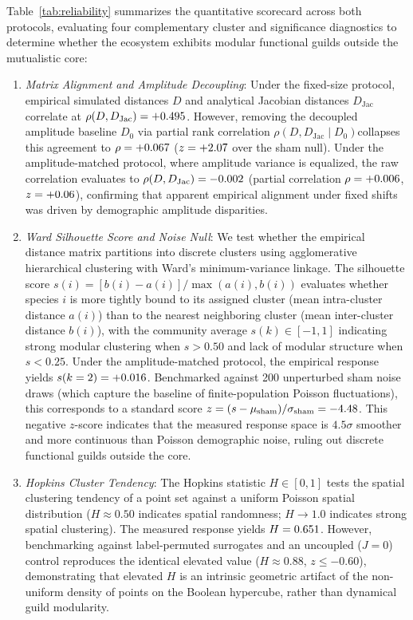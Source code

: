 \documentclass[twocolumn,amsmath,amssymb,aps,pra,10pt,floatfix,nofootinbib]{revtex4-2}
\begin{document}
Table~\ref{tab:reliability} summarizes the quantitative scorecard across both protocols, evaluating four complementary cluster and significance diagnostics to determine whether the ecosystem exhibits modular functional guilds outside the mutualistic core:
\begin{enumerate}
    \item \textit{Matrix Alignment and Amplitude Decoupling}: Under the fixed-size protocol, empirical simulated distances $D$ and analytical Jacobian distances $D_{\text{Jac}}$ correlate at $\rho(D, D_{\text{Jac}}) = +0.495$. However, removing the decoupled amplitude baseline $D_0$ via partial rank correlation $\rho(D, D_{\text{Jac}} \mid D_0)$\footnotemark[2] collapses this agreement to $\rho = +0.067$ ($z = +2.07$ over the sham null). Under the amplitude-matched protocol, where amplitude variance is equalized, the raw correlation evaluates to $\rho(D, D_{\text{Jac}}) = -0.002$ (partial correlation $\rho = +0.006$, $z = +0.06$), confirming that apparent empirical alignment under fixed shifts was driven by demographic amplitude disparities.
    \item \textit{Ward Silhouette Score and Noise Null}: We test whether the empirical distance matrix partitions into discrete clusters using agglomerative hierarchical clustering with Ward's minimum-variance linkage. The silhouette score $s(i) = [b(i) - a(i)] / \max(a(i), b(i))$ evaluates whether species $i$ is more tightly bound to its assigned cluster (mean intra-cluster distance $a(i)$) than to the nearest neighboring cluster (mean inter-cluster distance $b(i)$), with the community average $s(k) \in [-1, 1]$ indicating strong modular clustering when $s > 0.50$ and lack of modular structure when $s < 0.25$. Under the amplitude-matched protocol, the empirical response yields $s(k=2) = +0.016$. Benchmarked against 200 unperturbed sham noise draws (which capture the baseline of finite-population Poisson fluctuations), this corresponds to a standard score $z = (s - \mu_{\text{sham}}) / \sigma_{\text{sham}} = -4.48$. This negative $z$-score indicates that the measured response space is $4.5\sigma$ smoother and more continuous than Poisson demographic noise, ruling out discrete functional guilds outside the core.
    \item \textit{Hopkins Cluster Tendency}\footnotemark[2]: The Hopkins statistic $H \in [0, 1]$ tests the spatial clustering tendency of a point set against a uniform Poisson spatial distribution ($H \approx 0.50$ indicates spatial randomness; $H \to 1.0$ indicates strong spatial clustering). The measured response yields $H = 0.651$. However, benchmarking against label-permuted surrogates and an uncoupled ($J=0$) control reproduces the identical elevated value ($H \approx 0.88$, $z \le -0.60$), demonstrating that elevated $H$ is an intrinsic geometric artifact of the non-uniform density of points on the Boolean hypercube, rather than dynamical guild modularity.

\end{enumerate}
\end{document}
